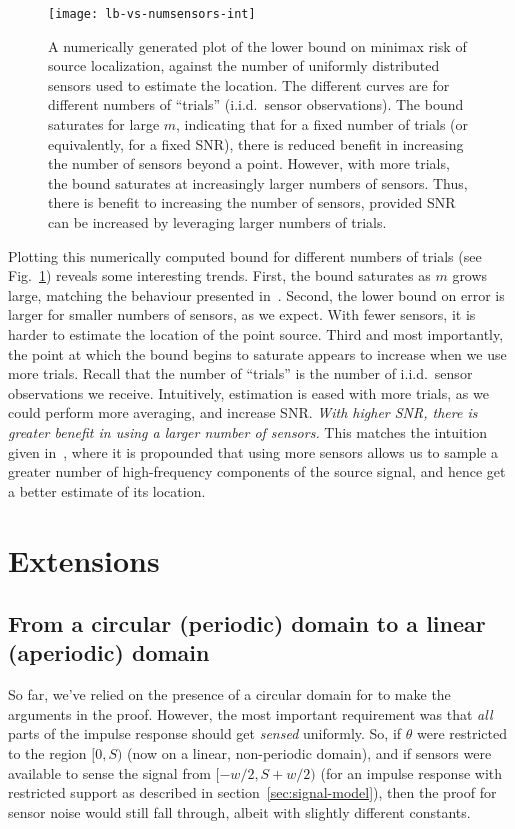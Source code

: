 \documentclass[conference]{IEEEtran}
\begin{document}
\begin{figure}[t]
	\centering
	\texttt{[image: lb-vs-numsensors-int]}
	\caption{A numerically generated plot of the lower bound on minimax risk of
	source localization, against the number of uniformly distributed sensors
used to estimate the location. The different curves are for different numbers
of ``trials'' (i.i.d.\ sensor observations). The bound saturates for large $m$,
indicating that for a fixed number of trials (or equivalently, for a fixed
SNR), there is reduced benefit in increasing the number of sensors beyond a
point. However, with more trials, the bound saturates at increasingly larger
numbers of sensors. Thus, there is benefit to increasing the number of sensors,
provided SNR can be increased by leveraging larger numbers of trials.}
	\label{fig:numerical}
\end{figure}

Plotting this numerically computed bound for different numbers of trials (see
Fig.~\ref{fig:numerical}) reveals some interesting trends. First, the bound
saturates as $m$ grows large, matching the behaviour presented
in~\cite{Grover2016Fundamental}. Second, the lower bound on error is larger for
smaller numbers of sensors, as we expect. With fewer sensors, it is harder to
estimate the location of the point source. Third and most importantly, the
point at which the bound begins to saturate appears to increase when we use
more trials. Recall that the number of ``trials'' is the number of i.i.d.\
sensor observations we receive. Intuitively, estimation is eased with more
trials, as we could perform more averaging, and increase SNR. \emph{With higher
SNR, there is greater benefit in using a larger number of sensors.} This
matches the intuition given in~\cite{Grover2016Information}, where it is
propounded that using more sensors allows us to sample a greater number of
high-frequency components of the source signal, and hence get a better estimate
of its location.

\section{Extensions}
\label{sec:extensions}

\subsection{From a circular (periodic) domain to a linear (aperiodic) domain}

So far, we've relied on the presence of a circular domain for to make the
arguments in the proof. However, the most important requirement was that
\emph{all} parts of the impulse response should get \emph{sensed} uniformly.
So, if $\theta$ were restricted to the region $[0, S)$ (now on a linear,
non-periodic domain), and if sensors were available to sense the signal from
$[-w/2, S{+}w/2)$ (for an impulse response with restricted support as described
in section~\ref{sec:signal-model}), then the proof for sensor noise would still
fall through, albeit with slightly different constants.
\end{document}
